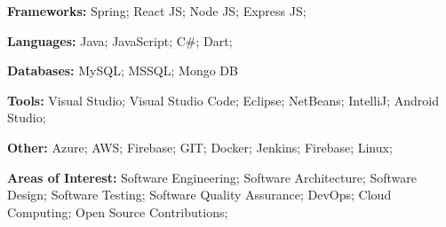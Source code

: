 

\begin{cventries}

  \cventryTec
  {
    \begin{cvitems} %
      \item {\textbf{Frameworks:} Spring; React JS; Node JS; Express JS;}
      \item {\textbf{Languages:} Java; JavaScript; C\#; Dart;}
      \item {\textbf{Databases:} MySQL; MSSQL; Mongo DB}
      \item {\textbf{Tools:} Visual Studio; Visual Studio Code; Eclipse; NetBeans; IntelliJ; Android Studio;}
      \item {\textbf{Other:} Azure; AWS; Firebase; GIT; Docker; Jenkins; Firebase; Linux;}
      \item {\textbf{Areas of Interest:} Software Engineering; Software Architecture; Software Design; Software Testing; Software Quality Assurance; DevOps; Cloud Computing; Open Source Contributions;}
    \end{cvitems}
  }



\end{cventries}
